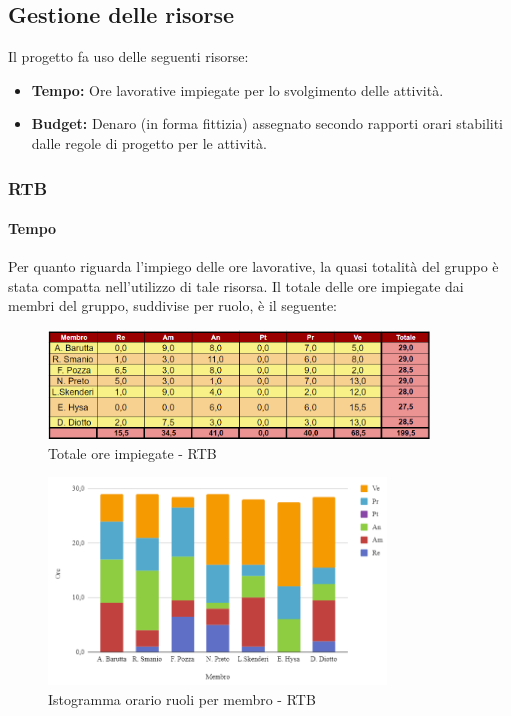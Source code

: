 \subsection{Gestione delle risorse}
Il progetto fa uso delle seguenti risorse:

\begin{itemize}
  \item \textbf{Tempo:} Ore lavorative impiegate per lo svolgimento delle attività.
  \item \textbf{Budget:} Denaro (in forma fittizia) assegnato secondo rapporti orari stabiliti dalle regole di progetto per le attività.
\end{itemize}
\subsubsection{RTB}
\paragraph{Tempo}
Per quanto riguarda l’impiego delle ore lavorative, la quasi totalità del gruppo è stata
compatta nell’utilizzo di tale risorsa.
Il totale delle ore impiegate dai membri del gruppo, suddivise per ruolo, è il seguente:
\begin{figure}[H]
    \centering
    \includegraphics[width=0.9\textwidth]{../Images/riepilogoRTBOreMembro.png}
    \caption{Totale ore impiegate - RTB}
    \label{fig:Tot_oreRTB}
\end{figure}
\begin{figure}[H]
    \centering
    \includegraphics[width=0.8\textwidth]{../Images/graficoOrarioRuoloRTB.png}
    \caption{Istogramma orario ruoli per membro  - RTB}
    \label{fig:GraficoOreRTB}
\end{figure}



